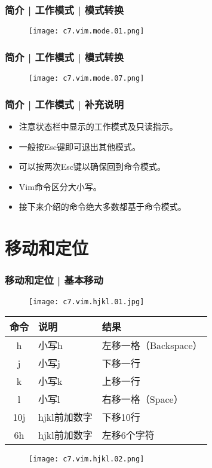 \begin{frame}
  \frametitle{简介 | 工作模式 | \alert{模式转换}}
  \begin{figure}
    \centering
    \texttt{[image: c7.vim.mode.01.png]}
  \end{figure}
\end{frame}

\begin{frame}
  \frametitle{简介 | 工作模式 | 模式转换}
  \begin{figure}
    \centering
    \texttt{[image: c7.vim.mode.07.png]}
  \end{figure}
\end{frame}

\begin{frame}
  \frametitle{简介 | 工作模式 | 补充说明}
  \begin{itemize}[<+->]
    \item 注意状态栏中显示的工作模式及只读指示。
    \item 一般按Esc键即可退出其他模式。
    \item 可以按两次Esc键以确保回到命令模式。
    \item Vim命令区分大小写。
    \item 接下来介绍的命令绝大多数都基于命令模式。
  \end{itemize}
\end{frame}

\section{移动和定位}
\begin{frame}
  \frametitle{移动和定位 | \alert{基本移动}}
  \begin{figure}
    \centering
    \texttt{[image: c7.vim.hjkl.01.jpg]}
  \end{figure}
  \begin{table}
    \centering
    \begin{tabularx}{0.8\textwidth}{cXX}
      \hline
      \rowcolor{blue!50}命令 & 说明 & 结果\\
      \hline
      h & 小写h & 左移一格（Backspace）\\
      j & 小写j & 下移一行\\
      k & 小写k & 上移一行\\
      l & 小写l & 右移一格（Space）\\
      10j & hjkl前加数字 & 下移10行\\
      6h & hjkl前加数字 & 左移6个字符\\
      \hline
    \end{tabularx}
  \end{table}
  \begin{figure}
    \centering
    \texttt{[image: c7.vim.hjkl.02.png]}
  \end{figure}
\end{frame}

